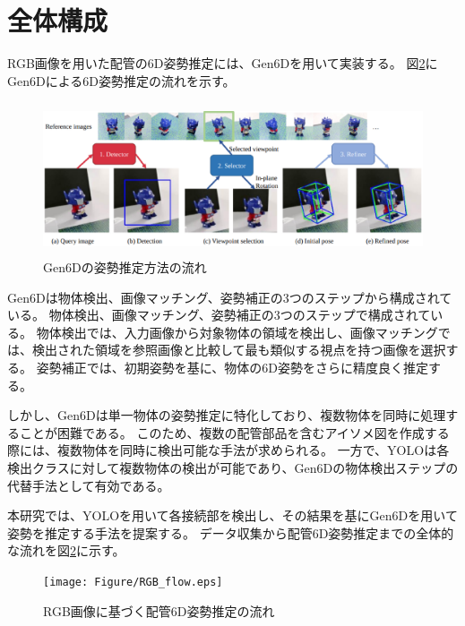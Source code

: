 \section{全体構成}
RGB画像を用いた配管の6D姿勢推定には、Gen6Dを用いて実装する。
図\ref{fig:f2}にGen6Dによる6D姿勢推定の流れを示す。
\begin{figure}[htbt]
	\centering
	 \includegraphics[height=45mm]{Figure/Gen6D.eps}
	 \caption{Gen6Dの姿勢推定方法の流れ}
	 \label{fig:f2}
\end{figure}

Gen6Dは物体検出、画像マッチング、姿勢補正の3つのステップから構成されている。
物体検出、画像マッチング、姿勢補正の3つのステップで構成されている。
物体検出では、入力画像から対象物体の領域を検出し、画像マッチングでは、検出された領域を参照画像と比較して最も類似する視点を持つ画像を選択する。
姿勢補正では、初期姿勢を基に、物体の6D姿勢をさらに精度良く推定する。

しかし、Gen6Dは単一物体の姿勢推定に特化しており、複数物体を同時に処理することが困難である。
このため、複数の配管部品を含むアイソメ図を作成する際には、複数物体を同時に検出可能な手法が求められる。
一方で、YOLOは各検出クラスに対して複数物体の検出が可能であり、Gen6Dの物体検出ステップの代替手法として有効である。

本研究では、YOLOを用いて各接続部を検出し、その結果を基にGen6Dを用いて姿勢を推定する手法を提案する。
データ収集から配管6D姿勢推定までの全体的な流れを図\ref{fig:f2}に示す。
\begin{figure}[htbt]
	\centering
	 \texttt{[image: Figure/RGB\_flow.eps]}
	 \caption{RGB画像に基づく配管6D姿勢推定の流れ}
	 \label{fig:f2}
\end{figure}


